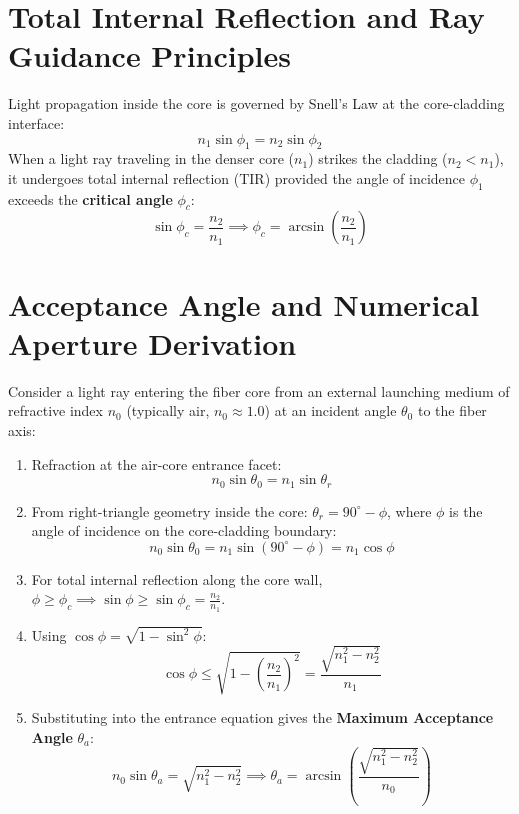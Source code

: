 \section{Total Internal Reflection and Ray Guidance Principles}
Light propagation inside the core is governed by Snell's Law at the core-cladding interface:
\begin{equation}
n_1 \sin\phi_1 = n_2 \sin\phi_2
\end{equation}
When a light ray traveling in the denser core ($n_1$) strikes the cladding ($n_2 < n_1$), it undergoes total internal reflection (TIR) provided the angle of incidence $\phi_1$ exceeds the \textbf{critical angle} $\phi_c$:
\begin{equation}
\sin\phi_c = \frac{n_2}{n_1} \implies \phi_c = \arcsin\left(\frac{n_2}{n_1}\right)
\end{equation}

\section{Acceptance Angle and Numerical Aperture Derivation}
Consider a light ray entering the fiber core from an external launching medium of refractive index $n_0$ (typically air, $n_0 \approx 1.0$) at an incident angle $\theta_0$ to the fiber axis:
\begin{enumerate}[leftmargin=*,itemsep=2pt]
    \item Refraction at the air-core entrance facet:
    \begin{equation}
    n_0 \sin\theta_0 = n_1 \sin\theta_r
    \end{equation}
    \item From right-triangle geometry inside the core: $\theta_r = 90^\circ - \phi$, where $\phi$ is the angle of incidence on the core-cladding boundary:
    \begin{equation}
    n_0 \sin\theta_0 = n_1 \sin(90^\circ - \phi) = n_1 \cos\phi
    \end{equation}
    \item For total internal reflection along the core wall, $\phi \ge \phi_c \implies \sin\phi \ge \sin\phi_c = \frac{n_2}{n_1}$.
    \item Using $\cos\phi = \sqrt{1 - \sin^2\phi}$:
    \begin{equation}
    \cos\phi \le \sqrt{1 - \left(\frac{n_2}{n_1}\right)^2} = \frac{\sqrt{n_1^2 - n_2^2}}{n_1}
    \end{equation}
    \item Substituting into the entrance equation gives the \textbf{Maximum Acceptance Angle} $\theta_a$:
    \begin{equation}
    n_0 \sin\theta_a = \sqrt{n_1^2 - n_2^2} \implies \theta_a = \arcsin\left(\frac{\sqrt{n_1^2 - n_2^2}}{n_0}\right)
    \end{equation}
\end{enumerate}

